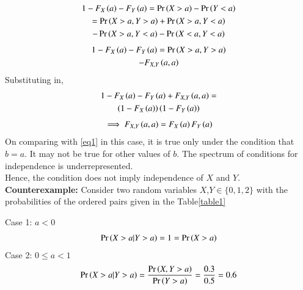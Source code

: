 \documentclass[journal,12pt,twocolumn]{IEEEtran}
\begin{document}
\begin{enumerate}
\begin{multline}
        1-F_X\left(a\right)-F_Y\left(a\right)=\Pr\left(X>a\right)-\Pr\left(Y<a\right)\\=\Pr\left(X>a,Y>a\right)+\Pr\left(X>a,Y<a\right)\\-\Pr\left(X>a,Y<a\right)-\Pr\left(X<a,Y<a\right)
    \end{multline}
    \begin{multline}
        1-F_X\left(a\right)-F_Y\left(a\right)=\Pr\left(X>a,Y>a\right)\\-F_{X,Y}\left(a,a\right)
    \end{multline}
    Substituting in,
    \begin{multline}
        1-F_X\left(a\right)-F_Y\left(a\right)+F_{X,Y}\left(a,a\right)=\\ \left(1-F_X\left(a\right)\right)\left(1-F_Y\left(a\right)\right)
    \end{multline}
    \begin{align}
        \implies F_{X,Y}\left(a,a\right)=F_X\left(a\right)F_Y\left(a\right)
    \end{align}
    On comparing with \eqref{eq1} in this case, it is true only under the condition that $b=a$. It may not be true for other values of $b$. The spectrum of conditions for independence is underrepresented.\\ Hence, the condition does not imply independence of $X$ and $Y$.\\
    \textbf{Counterexample:} Consider two random variables $X$,$Y \in \{0,1,2\}$ with the probabilities of the ordered pairs  given in the Table\ref{table1}
    \begin{center}
    \begin{table}[H]
    \centering
    \caption{}
    \label{table1}
    \end{table}
    \end{center}
    Case 1: $a<0$
    \begin{align}
        \Pr\left(X>a|Y>a\right)=1=\Pr\left(X>a\right)
    \end{align}
    Case 2: $0\leq a <1$
    \begin{align}
        \pr{X>a|Y>a}=\frac{\pr{X,Y>a}}{\pr{Y>a}}=\frac{0.3}{0.5}=0.6\\

\end{align}
\end{enumerate}
\end{document}
